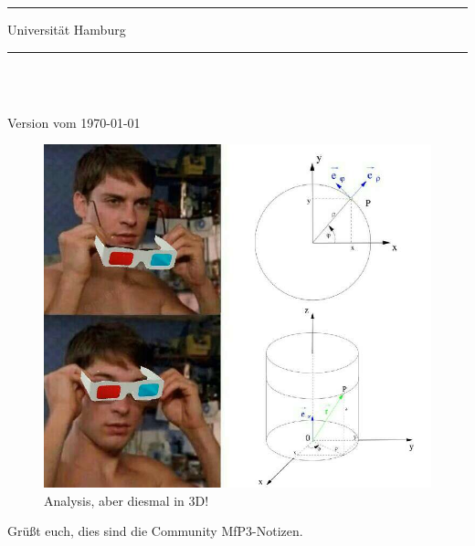 

\setlength{\abovedisplayskip}{3pt}
\setlength{\belowdisplayskip}{3pt}
\setlength{\abovedisplayshortskip}{3pt}
\setlength{\belowdisplayshortskip}{3pt}

	\thispagestyle{empty}
	\rule{\linewidth}{1pt}
	
	\vspace{6pt}				%
	
	\begin{minipage}{0.6\textwidth}
		\begin{flushleft} 
		\Profs
		\end{flushleft}
	\end{minipage}
	\begin{minipage}{0.39\textwidth}
		\begin{flushright}
			Universität Hamburg
		\end{flushright}
	\end{minipage}

	\rule{\linewidth}{1pt}\\
	\begin{center}
		\Large{\textsf{\titel}}\\
		\small\textsf{Version vom \today}
\vspace{8pt}
\end{center}


\begin{figure}[htbp]
    \centering
    \includegraphics[width=.55\textwidth]{Dateien/3D_Analysis.jpg}\\
    Analysis, aber diesmal in 3D!\\
\end{figure}
\vfill
Grüßt euch, dies sind die Community MfP3-Notizen. \\

